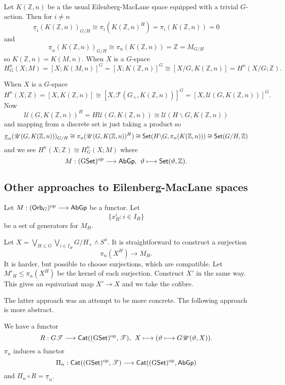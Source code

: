 \documentclass[11pt]{article}
\begin{document}
\begin{SecondWeek}
\begin{exmp*}
Let $K(\mathbb{Z},n)$ be a the usual Eilenberg-MacLane space equipped with a trivial $G$-action. Then for $i\neq n$
\[\underline{\pi}_i(K(\mathbb{Z},n))_{G/H}\cong
\pi_i(K(\mathbb{Z},n)^H)=\pi_i(K(\mathbb{Z},n))=0\]
and
\[\underline{\pi}_n(K(\mathbb{Z},n))_{G/H}\cong
\pi_n(K(\mathbb{Z},n))=\mathbb{Z}=M_{G/H}\]
so $K(\mathbb{Z},n)=K(M,n)$. When $X$ is a $G$-space
\[H^n_G(X;M)=[X;K(M,n)]^G=[X;K(\mathbb{Z},n)]^G
\cong[X/G,K(\mathbb{Z},n)]=H^n(X/G;\mathbb{Z}).\]
\end{exmp*}
\begin{exmp*}
When $X$ is a $G$-space
\[H^n(X;\mathbb{Z})=[X,K(\mathbb{Z},n)]
\cong[X,\mathscr{T}(G_+,K(\mathbb{Z},n))]^G=
[X,\mathscr{U}(G,K(\mathbb{Z},n))]^G.\]
Now
\[\mathscr{U}(G,K(\mathbb{Z},n))^H=H\mathscr{U}(G,K(\mathbb{Z},n))
\cong\mathscr{U}(H\backslash G,K(\mathbb{Z},n))\]
and mapping from a discrete set is just taking a product so
\[\underline{\pi}_n(\mathscr{U}(G,K(\mathbb{Z},n)))_{G/H}\cong
\pi_n(\mathscr{U}(G,K(\mathbb{Z},n))^H)\cong
\operatorname{{\mathsf{Set}}}(H\backslash G,\pi_n(K(\mathbb{Z},n)))\cong\operatorname{{\mathsf{Set}}}(G/H,\mathbb{Z})\]
and we see $H^n(X;\mathbb{Z})\cong H^n_G(X;M)$ where
\[M:(\operatorname{{G\mathsf{Set}}})^{\textup{op}}\longrightarrow\operatorname{{\mathsf{AbGp}}},
\hspace{4pt}
\vartheta\longmapsto\operatorname{{\mathsf{Set}}}(\vartheta,\mathbb{Z}).\]
\end{exmp*}






\subsection*{Other approaches to Eilenberg-MacLane spaces}
Let $M:(\operatorname{{\mathsf{Orb}}}_G)^{\textup{op}}\longrightarrow\operatorname{{\mathsf{AbGp}}}$ be a functor. Let
\[\{x^i_H:i\in I_H\}\]
be a set of generators for $M_H$.

Let $X=\bigvee_{H\leq G}\bigvee_{i\in I_H}G/H_+\wedge S^n$. It is straightforward to construct a surjection
\[\pi_n(X^H)\to M_H.\]
It is harder, but possible to choose surjections, which are compatible. Let $M'_H\leq\pi_n(X^H)$ be the kernel of each surjection. Construct $X'$ in the same way. This gives an equivariant map $X'\to X$ and we take the cofibre.

The latter approach was an attempt to be more concrete. The following approach is more abstract.

We have a functor
\[R:G\mathscr{T}\longrightarrow\operatorname{{\mathsf{Cat}}}
((\operatorname{{G\mathsf{Set}}})^{\textup{op}},\mathscr{T}),
\hspace{4pt}
X\longmapsto(\vartheta\longmapsto G\mathscr{U}(\vartheta,X)).\]
$\pi_n$ induces a functor
\[\Pi_n:\operatorname{{\mathsf{Cat}}}
((\operatorname{{G\mathsf{Set}}})^{\textup{op}},\mathscr{T})\longrightarrow
\operatorname{{\mathsf{Cat}}}
((\operatorname{{G\mathsf{Set}}})^{\textup{op}},\operatorname{{\mathsf{AbGp}}})\]
and $\Pi_n\circ R=\underline{\pi}_n$.


\end{SecondWeek}
\end{document}
